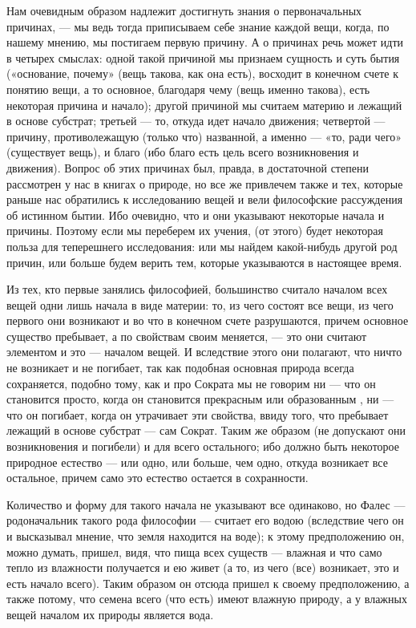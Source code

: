 \documentclass{article}
\begin{document}
Нам очевидным образом надлежит достигнуть знания о первоначальных причинах, — мы ведь тогда приписываем себе знание каждой вещи, когда, по нашему мнению, мы постигаем первую причину. А о причинах речь может идти в четырех смыслах: одной такой причиной мы признаем сущность и суть бытия («основание, почему»
\footnotemark[1]
(вещь такова, как она есть), восходит в конечном счете к понятию вещи, а то основное, благодаря чему (вещь именно такова), есть некоторая причина и начало);
\footnotemark[2]
другой причиной мы считаем материю и лежащий в основе субстрат; третьей — то, откуда идет начало движения; четвертой — причину, противолежащую (только что) названной, а именно — «то, ради чего» (существует вещь), и благо (ибо благо есть цель всего возникновения и движения). Вопрос об этих причинах был, правда, в достаточной степени рассмотрен у нас в книгах о природе, но все же привлечем также и тех, которые раньше нас обратились к исследованию вещей и вели философские рассуждения об истинном бытии. Ибо очевидно, что и они указывают некоторые начала и причины. Поэтому если мы переберем их учения, (от этого) будет некоторая польза для теперешнего исследования: или мы найдем какой-нибудь другой род причин, или больше будем верить тем, которые указываются в настоящее время.

Из тех, кто первые занялись философией, большинство считало началом всех вещей одни лишь начала в виде
\footnotemark[3]
материи: то, из чего состоят все вещи, из чего первого они возникают и во что в конечном счете разрушаются, причем основное существо пребывает, а по свойствам своим меняется, — это они считают элементом и это — началом вещей. И вследствие этого они полагают, что ничто не возникает и не погибает, так как подобная основная природа всегда сохраняется, подобно тому, как и про Сократа мы не говорим ни — что он становится просто, когда он становится прекрасным или образованным
\footnotemark[4]
, ни — что он погибает, когда он утрачивает эти свойства, ввиду того, что пребывает лежащий в основе субстрат — сам Сократ. Таким же образом (не допускают они возникновения и погибели) и для всего остального; ибо должно быть некоторое природное естество
\footnotemark[5]
— или одно, или больше, чем одно, откуда возникает все остальное, причем само это естество остается в сохранности.

Количество и форму для такого начала не указывают все одинаково, но Фалес --- родоначальник такого рода философии --- считает его водою (вследствие чего он и высказывал мнение, что земля находится на воде); к этому предположению он, можно думать, пришел, видя, что пища всех существ --- влажная и что само тепло из влажности получается и ею живет (а то, из чего (все) возникает, это и есть начало всего). Таким образом он отсюда пришел к своему предположению, а также потому, что семена всего (что есть) имеют влажную природу, а у влажных вещей началом их природы является вода.
\end{document}
